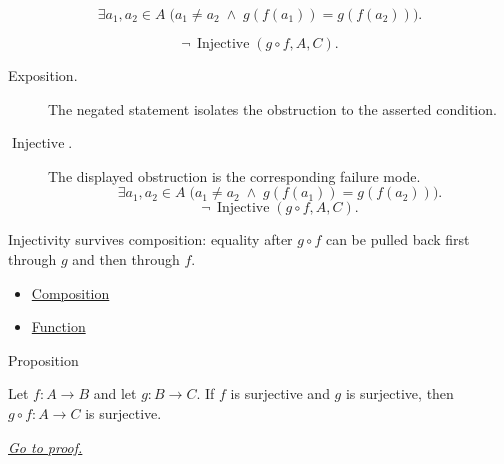 \begin{remark*}
\[
  \exists a_1,a_2\in A\;\bigl(a_1\neq a_2\;\wedge\;g(f(a_1))=g(f(a_2))\bigr).
\]
\end{remark*}

\begin{remark*}
\[
  \neg\,\operatorname{Injective}(g\circ f,A,C).
\]
\end{remark*}

\begin{remark*}
\begin{description}
  \item[Exposition.]
  The negated statement isolates the obstruction to the asserted condition.

  \item[\(\operatorname{Injective}.\)]
  The displayed obstruction is the corresponding failure mode.
  \[
  \exists a_1,a_2\in A\;\bigl(a_1\neq a_2\;\wedge\;g(f(a_1))=g(f(a_2))\bigr).
\]
  \[
  \neg\,\operatorname{Injective}(g\circ f,A,C).
\]
\end{description}
\end{remark*}



\begin{remark*}[Interpretation]
Injectivity survives composition: equality after $g\circ f$ can be
pulled back first through $g$ and then through $f$.
\end{remark*}

\begin{dependencies}
\begin{itemize}
  \item \hyperref[def:composition]{Composition}
  \item \hyperref[def:function]{Function}
\end{itemize}
\end{dependencies}

\begin{propositionbox}{Proposition}
\begin{proposition}
\label{prop:composition-surjective}
Let \(f:A\to B\) and let \(g:B\to C\). If \(f\) is surjective and \(g\)
is surjective, then \(g\circ f:A\to C\) is surjective.

\smallskip\noindent
\hyperref[prf:composition-surjective]{\textit{Go to proof.}}
\end{proposition}
\end{propositionbox}

